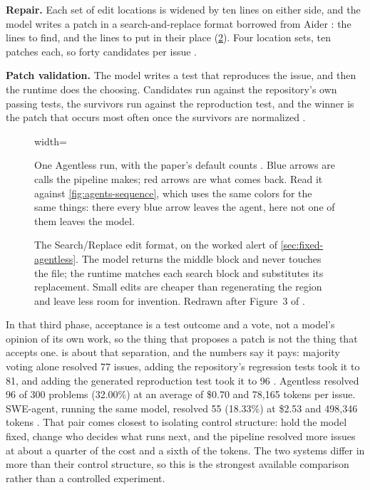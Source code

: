 \item \textbf{Repair.} Each set of edit locations is widened by ten lines on either side, and the
model writes a patch in a search-and-replace format borrowed from Aider
\citep{gauthier2024aider}: the lines to find, and the lines to put in their place
(\cref{fig:search-replace}). Four location
sets, ten patches each, so forty candidates per issue \citep[\S3.2, \S4]{xia2025agentless}.

\item \textbf{Patch validation.} The model writes a test that reproduces the issue, and then the
runtime does the choosing. Candidates run against the repository's own passing tests, the
survivors run against the reproduction test, and the winner is the patch that occurs most often
once the survivors are normalized \citep[\S3.3]{xia2025agentless}.

\ei

\begin{figure}[htbp]
  \centering
  \begin{adjustbox}{width=\linewidth}\end{adjustbox}
  \caption{One Agentless run, with the paper's default counts \citep[\S3, \S4]{xia2025agentless}.
  Blue arrows are calls the pipeline makes; red arrows are what comes back. Read it against
  \cref{fig:agents-sequence}, which uses the same colors for the same things: there every blue
  arrow leaves the agent, here not one of them leaves the model.}
  \label{fig:seq-agentless}
\end{figure}

\begin{figure}[htbp]
  \centering
  
  \caption{The Search/Replace edit format, on the worked alert of \cref{sec:fixed-agentless}. The model returns
  the middle block and never touches the file; the runtime matches each search block and
  substitutes its replacement. Small edits are cheaper than regenerating the region and leave less
  room for invention. Redrawn after Figure~3 of \citet{xia2025agentless}.}
  \label{fig:search-replace}
\end{figure}

In that third phase, acceptance is a test outcome and a vote, not a model's opinion of its own
work, so the thing that proposes a patch is not the thing that accepts one.  
is about that separation, and the numbers say it pays: majority voting alone resolved 77 issues, 
adding the repository's regression tests took it to 81, and adding the generated reproduction test 
took it to 96 \citep[\S5.2.3]{xia2025agentless}.
Agentless resolved 96 of 300 problems (32.00\%) at an average of \$0.70 and 78,165 tokens per
issue. SWE-agent, running the same model, resolved 55 (18.33\%) at \$2.53 and 498,346 tokens
\citep[Table~1]{xia2025agentless}. That pair comes closest to isolating control structure: hold
the model fixed, change who decides what runs next, and the pipeline resolved more issues at about
a quarter of the cost and a sixth of the tokens. The two systems differ in more than their control
structure, so this is the strongest available comparison rather than a controlled experiment.


